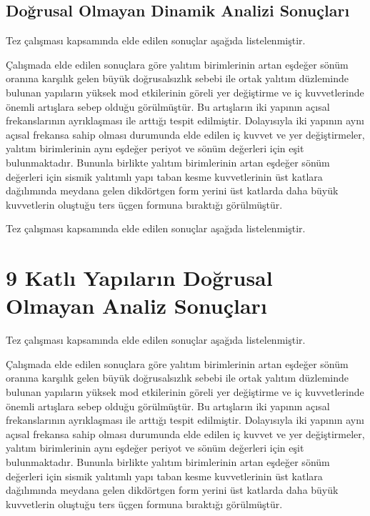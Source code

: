 \subsection{Doğrusal Olmayan Dinamik Analizi Sonuçları}

Tez çalışması kapsamında elde edilen sonuçlar aşağıda listelenmiştir. 

Çalışmada elde edilen sonuçlara göre yalıtım birimlerinin artan eşdeğer
sönüm oranına karşılık gelen büyük doğrusalsızlık sebebi ile ortak
yalıtım düzleminde bulunan yapıların yüksek mod etkilerinin göreli
yer değiştirme ve iç kuvvetlerinde önemli artışlara sebep olduğu görülmüştür.
Bu artışların iki yapının açısal frekanslarının ayrıklaşması ile arttığı
tespit edilmiştir. Dolayısıyla iki yapının aynı açısal frekansa sahip
olması durumunda elde edilen iç kuvvet ve yer değiştirmeler, yalıtım
birimlerinin aynı eşdeğer periyot ve sönüm değerleri için eşit bulunmaktadır.
Bununla birlikte yalıtım birimlerinin artan eşdeğer sönüm değerleri
için sismik yalıtımlı yapı taban kesme kuvvetlerinin üst katlara dağılımında
meydana gelen dikdörtgen form yerini üst katlarda daha büyük kuvvetlerin
oluştuğu ters üçgen formuna bıraktığı görülmüştür.

Tez çalışması kapsamında elde edilen sonuçlar aşağıda listelenmiştir. 

\section{9 Katlı Yapıların Doğrusal Olmayan Analiz Sonuçları}

Tez çalışması kapsamında elde edilen sonuçlar aşağıda listelenmiştir. 

Çalışmada elde edilen sonuçlara göre yalıtım birimlerinin artan eşdeğer
sönüm oranına karşılık gelen büyük doğrusalsızlık sebebi ile ortak
yalıtım düzleminde bulunan yapıların yüksek mod etkilerinin göreli
yer değiştirme ve iç kuvvetlerinde önemli artışlara sebep olduğu görülmüştür.
Bu artışların iki yapının açısal frekanslarının ayrıklaşması ile arttığı
tespit edilmiştir. Dolayısıyla iki yapının aynı açısal frekansa sahip
olması durumunda elde edilen iç kuvvet ve yer değiştirmeler, yalıtım
birimlerinin aynı eşdeğer periyot ve sönüm değerleri için eşit bulunmaktadır.
Bununla birlikte yalıtım birimlerinin artan eşdeğer sönüm değerleri
için sismik yalıtımlı yapı taban kesme kuvvetlerinin üst katlara dağılımında
meydana gelen dikdörtgen form yerini üst katlarda daha büyük kuvvetlerin
oluştuğu ters üçgen formuna bıraktığı görülmüştür.

